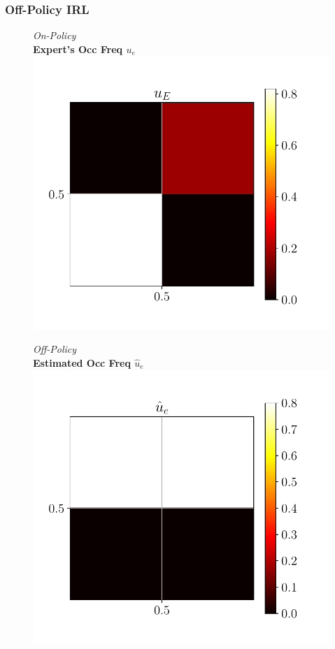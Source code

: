 \documentclass{beamer}
\begin{document}
\begin{frame}
\frametitle{Off-Policy IRL}
\begin{figure}
  \begin{center}
  \begin{minipage}{0.45\linewidth}
    \centering
    \emph{On-Policy}\\
    \textbf{Expert's Occ Freq $u_e$}
    \includegraphics[width=\linewidth]{../../pres_roil/plots/all_state/ue.pdf}
  \end{minipage}
  \begin{minipage}{0.45\linewidth}
    \centering
    \emph{Off-Policy}\\
    \textbf{Estimated Occ Freq $\hat{u}_e$}
    \includegraphics[width=\linewidth]{../../pres_roil/plots/all_state/uehat.pdf}
  \end{minipage}
  \end{center}
\end{figure}
\end{frame}
\end{document}
